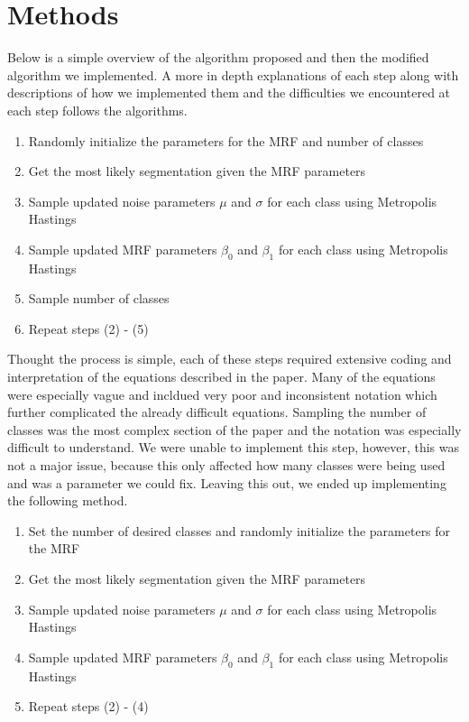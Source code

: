 \documentclass[11pt]{article}
\begin{document}
\section{Methods}
Below is a simple overview of the algorithm proposed and then the modified algorithm we implemented.
A more in depth explanations of each step along with descriptions of how we implemented them and the difficulties we encountered at each step follows the algorithms.

\begin{enumerate}
	\item Randomly initialize the parameters for the MRF and number of classes
	\item Get the most likely segmentation given the MRF parameters
	\item Sample updated noise parameters $\mu$ and $\sigma$ for each class using Metropolis Hastings
	\item Sample updated MRF parameters $\beta_0$ and $\beta_1$ for each class using Metropolis Hastings
	\item Sample number of classes
	\item Repeat steps (2) - (5)
\end{enumerate}

Thought the process is simple, each of these steps required extensive coding and interpretation of the equations described in the paper.
Many of the equations were especially vague and incldued very poor and inconsistent notation which further complicated the already difficult equations.
Sampling the number of classes was the most complex section of the paper and the notation was especially difficult to understand.
We were unable to implement this step, however, this was not a major issue, because this only affected how many classes were being used and was a parameter we could fix.
Leaving this out, we ended up implementing the following method.

\begin{enumerate}
	\item Set the number of desired classes and randomly initialize the parameters for the MRF
	\item Get the most likely segmentation given the MRF parameters
	\item Sample updated noise parameters $\mu$ and $\sigma$ for each class using Metropolis Hastings
	\item Sample updated MRF parameters $\beta_0$ and $\beta_1$ for each class using Metropolis Hastings
	\item Repeat steps (2) - (4)
\end{enumerate}
\end{document}

